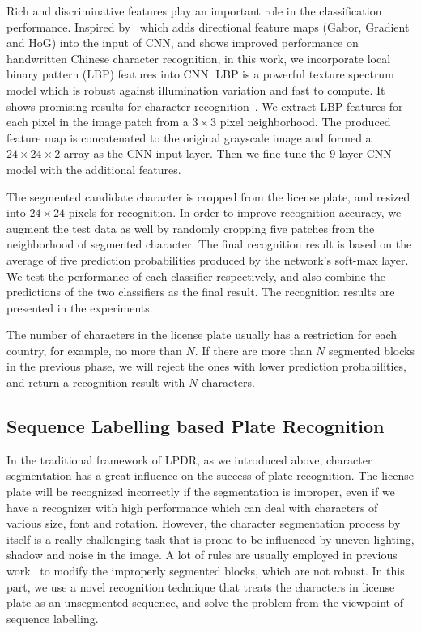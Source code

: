 \documentclass[twocolumn]{svjour3}
\begin{document}
Rich and discriminative features play an important role in the classification performance. Inspired by~\cite{Zhong2015High} which adds directional feature maps (Gabor, Gradient and HoG) into the input of CNN, and shows improved performance on handwritten Chinese character recognition, in this work, we incorporate local binary pattern (LBP) features into CNN. LBP is a powerful texture spectrum model which is robust against illumination variation and fast to compute. It shows promising results for character recognition~\cite{Hsu2013,Chen2011LBP}.
We extract LBP features for each pixel in the image patch from a $3 \times 3$ pixel neighborhood. The produced feature map is concatenated to the original grayscale image and formed a $24 \times 24 \times 2$ array as the CNN input layer. Then we fine-tune the $9$-layer CNN model with the additional features. %

The segmented candidate character is cropped from the license plate, and resized into $24 \times 24$ pixels for recognition. In order to improve recognition accuracy, we augment the test data as well by randomly cropping five patches from the neighborhood of segmented character. The final recognition result is based on the average of five prediction probabilities produced by the network's soft-max layer. We test the performance of each classifier respectively, and also combine the predictions of the two classifiers as the final result. The recognition results are presented in the experiments.

%
The number of characters in the license plate usually has a restriction for each country, for example, no more than $N$. If there are more than $N$ segmented blocks in the previous phase, we will reject the ones with lower prediction probabilities, and return a recognition result with $N$ characters.

\subsection{Sequence Labelling based Plate Recognition}\label{sec:Sequence}
In the traditional framework of LPDR, as we introduced above, character segmentation has a great influence on the success of plate recognition. The license plate will be recognized incorrectly if the segmentation is improper, even if we have a recognizer with high performance which can deal with characters of various size, font and rotation. However, the character segmentation process by itself is a really challenging task that is prone to be influenced by uneven lighting, shadow and noise in the image. A lot of rules are usually employed in previous work~\cite{Yoon2011,Zheng2013An,Hsu2013} to modify the improperly segmented blocks, which are not robust. In this part, we use a novel recognition technique that treats the characters in license plate as an unsegmented sequence, and solve the problem from the viewpoint of sequence labelling.
\end{document}
